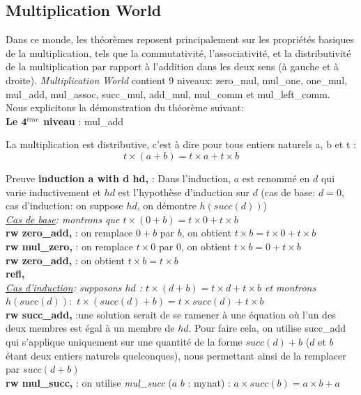 \subsection{Multiplication World}
Dans ce monde, les théorèmes reposent principalement sur les propriétés basiques de la multiplication, tels que la commutativité, l'associativité, et la distributivité de la multiplication par rapport à l'addition dans les deux sens (à gauche et à droite). \textit{Multiplication World} contient 9 niveaux: zero\_mul, mul\_one, one\_mul, mul\_add, mul\_assoc, succ\_mul, add\_mul, mul\_comm et mul\_left\_comm.\\ Nous explicitons la démonstration du théorème suivant: \\
\textbf{Le 4$^{ème}$ niveau} : mul\_add  \begin{center} La multiplication est distributive, c'est à dire pour tous entiers naturels a, b et t : $$t\times(a+b)=t\times a+t\times b$$ \end{center}
Preuve
\textbf{induction a with d hd,} : Dans l'induction, \textbf{$a$} est renommé en \textbf{$d$} qui varie inductivement et \textbf{$hd$} est l'hypothèse d'induction sur $d$ (cas de base: $d=0$, cas d'induction: on suppose $hd$, on démontre $h(succ(d))$)  \\
\textit{\underline{Cas de base}: montrons que $t \times (0 + b) = t \times 0 + t \times b$}\\
\textbf{rw zero\_add,} : on remplace $0+b$ par $b$, on obtient $t\times b=t\times0+t\times b$ \\
\textbf{rw mul\_zero,} : on remplace $t\times0$ par $0$, on obtient $t\times b=0+t\times b$ \\
\textbf{rw zero\_add,} : on obtient $t\times b=t\times b$ \\
\textbf{refl,} \\
\textit{\underline{Cas d'induction}: supposons $hd$ : $t\times(d+b) = t \times d + t \times b$ et montrons $h(succ(d)):$ $t \times (succ (d) + b) = t \times succ (d) + t \times b$ }\\
\textbf{rw succ\_add,} :une solution serait de se ramener à une équation où l'un des deux membres est égal à un membre de $hd$. Pour faire cela, on utilise succ\_add qui s'applique uniquement sur une quantité de la forme $succ(d)+b$ ($d$ et $b$ étant deux entiers naturels quelconques), nous permettant ainsi de la remplacer par $succ(d+b)$\\
\textbf{rw mul\_succ,} : on utilise \textit{mul\_succ} ($a$ $b$ : mynat) : $a \times succ(b) = a \times b + a $\\
